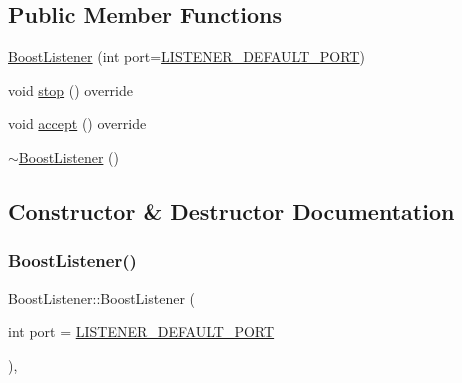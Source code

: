 \subsection*{Public Member Functions}
\begin{DoxyCompactItemize}
\item 
\mbox{\hyperlink{classBoostListener_a027dfad49bde876bf71ce8a27a437ac9}{Boost\+Listener}} (int port=\mbox{\hyperlink{IListener_8hpp_ae15716c4b5a51141b4029e52c2c2a744}{L\+I\+S\+T\+E\+N\+E\+R\+\_\+\+D\+E\+F\+A\+U\+L\+T\+\_\+\+P\+O\+RT}})
\item 
void \mbox{\hyperlink{classBoostListener_af83620fe2b6644903a6f631b8df2fd2d}{stop}} () override
\item 
void \mbox{\hyperlink{classBoostListener_a8a2849f0e1c513750bc74cb9a2c0d428}{accept}} () override
\item 
\mbox{\hyperlink{classBoostListener_ad50826b92d445b7e101ca261741b43b1}{$\sim$\+Boost\+Listener}} ()
\end{DoxyCompactItemize}


\subsection{Constructor \& Destructor Documentation}
\mbox{\label{classBoostListener_a027dfad49bde876bf71ce8a27a437ac9}} 
\subsubsection{\texorpdfstring{Boost\+Listener()}{BoostListener()}}
{\footnotesize\ttfamily Boost\+Listener\+::\+Boost\+Listener (\begin{DoxyParamCaption}\item[{int}]{port = {\ttfamily \mbox{\hyperlink{IListener_8hpp_ae15716c4b5a51141b4029e52c2c2a744}{L\+I\+S\+T\+E\+N\+E\+R\+\_\+\+D\+E\+F\+A\+U\+L\+T\+\_\+\+P\+O\+RT}}} }\end{DoxyParamCaption})\hspace{0.3cm}{\ttfamily [inline]}, {\ttfamily [explicit]}}

\mbox{\label{classBoostListener_ad50826b92d445b7e101ca261741b43b1}} 
